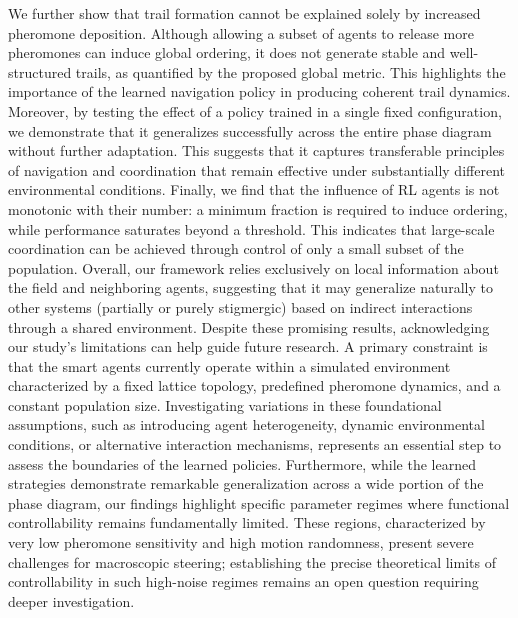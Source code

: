 \documentclass[openacc]{rsproca_new}
\begin{document}
We further show that trail formation cannot be explained solely by increased pheromone deposition. Although allowing a subset of agents to release more pheromones can induce global ordering, it does not generate stable and well-structured trails, as quantified by the proposed global metric. This highlights the importance of the learned navigation policy in producing coherent trail dynamics. Moreover, by testing the effect of a policy trained in a single fixed configuration, we demonstrate that it generalizes successfully across the entire phase diagram without further adaptation. This suggests that it captures transferable principles of navigation and coordination that remain effective under substantially different environmental conditions. Finally, we find that the influence of RL agents is not monotonic with their number: a minimum fraction is required to induce ordering, while performance saturates beyond a threshold. This indicates that large-scale coordination can be achieved through control of only a small subset of the population.
Overall, our framework relies exclusively on local information about the field and neighboring agents, suggesting that it may generalize naturally to other systems (partially or purely stigmergic) based on indirect interactions through a shared environment. Despite these promising results, acknowledging our study's limitations can help guide future research. A primary constraint is that the smart agents currently operate within a simulated environment characterized by a fixed lattice topology, predefined pheromone dynamics, and a constant population size. Investigating variations in these foundational assumptions, such as introducing agent heterogeneity, dynamic environmental conditions, or alternative interaction mechanisms, represents an essential step to assess the boundaries of the learned policies. Furthermore, while the learned strategies demonstrate remarkable generalization across a wide portion of the phase diagram, our findings highlight specific parameter regimes where functional controllability remains fundamentally limited. These regions, characterized by very low pheromone sensitivity and high motion randomness, present severe challenges for macroscopic steering; establishing the precise theoretical limits of controllability in such high-noise regimes remains an open question requiring deeper investigation.
\end{document}
